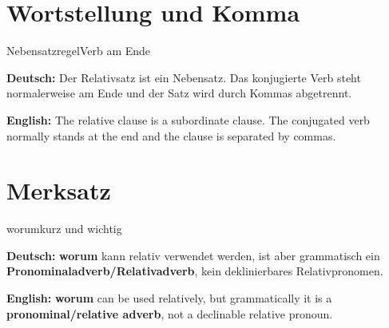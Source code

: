 \documentclass[a4paper,11pt]{article}
\newcommand{\GermanText}[1]{\textbf{Deutsch: }#1\par}
\newcommand{\EnglishText}[1]{{\small\color{SoftGray}\textbf{English: }#1\par}}
\begin{document}
\section{Wortstellung und Komma}

\begin{grammarentry}{Nebensatzregel}{Verb am Ende}

\GermanText{Der Relativsatz ist ein Nebensatz. Das konjugierte Verb steht normalerweise am Ende und der Satz wird durch Kommas abgetrennt.}

\EnglishText{The relative clause is a subordinate clause. The conjugated verb normally stands at the end and the clause is separated by commas.}

\end{grammarentry}

\section{Merksatz}

\begin{grammarentry}{worum}{kurz und wichtig}

\GermanText{\textbf{worum} kann relativ verwendet werden, ist aber grammatisch ein \textbf{Pronominaladverb/Relativadverb}, kein deklinierbares Relativpronomen.}

\EnglishText{\textbf{worum} can be used relatively, but grammatically it is a \textbf{pronominal/relative adverb}, not a declinable relative pronoun.}

\end{grammarentry}
\end{document}
